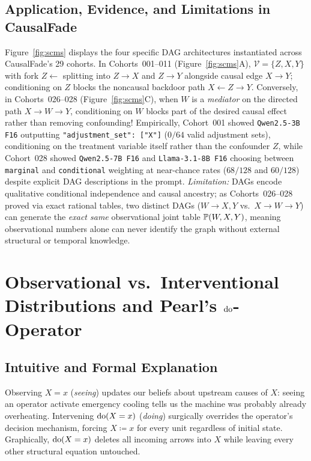 \subsection{Application, Evidence, and Limitations in CausalFade}
Figure~\ref{fig:scms} displays the four specific DAG architectures instantiated across CausalFade's 29 cohorts. In Cohorts~001--011 (Figure~\ref{fig:scms}A), $\mathcal{V} = \{Z, X, Y\}$ with fork $Z \leftarrow$ splitting into $Z \to X$ and $Z \to Y$ alongside causal edge $X \to Y$; conditioning on $Z$ blocks the noncausal backdoor path $X \leftarrow Z \to Y$. Conversely, in Cohorts~026--028 (Figure~\ref{fig:scms}C), when $W$ is a \emph{mediator} on the directed path $X \to W \to Y$, conditioning on $W$ blocks part of the desired causal effect rather than removing confounding! Empirically, Cohort~001 showed \texttt{Qwen2.5-3B F16} outputting \texttt{"adjustment\_set": ["X"]} ($0/64$ valid adjustment sets), conditioning on the treatment variable itself rather than the confounder $Z$, while Cohort~028 showed \texttt{Qwen2.5-7B F16} and \texttt{Llama-3.1-8B F16} choosing between \texttt{marginal} and \texttt{conditional} weighting at near-chance rates ($68/128$ and $60/128$) despite explicit DAG descriptions in the prompt. \emph{Limitation:} DAGs encode qualitative conditional independence and causal ancestry; as Cohorts~026--028 proved via exact rational tables, two distinct DAGs ($W\to X,Y$ vs.\ $X\to W\to Y$) can generate the \emph{exact same} observational joint table $\mathbb{P}(W,X,Y)$, meaning observational numbers alone can never identify the graph without external structural or temporal knowledge.

\section{Observational vs.\ Interventional Distributions and Pearl's \texorpdfstring{$\operatorname{do}$}{do}-Operator}

\subsection{Intuitive and Formal Explanation}
Observing $X=x$ (\emph{seeing}) updates our beliefs about upstream causes of $X$: seeing an operator activate emergency cooling tells us the machine was probably already overheating. Intervening $\operatorname{do}(X=x)$ (\emph{doing}) surgically overrides the operator's decision mechanism, forcing $X \coloneqq x$ for every unit regardless of initial state. Graphically, $\operatorname{do}(X=x)$ deletes all incoming arrows into $X$ while leaving every other structural equation untouched.


